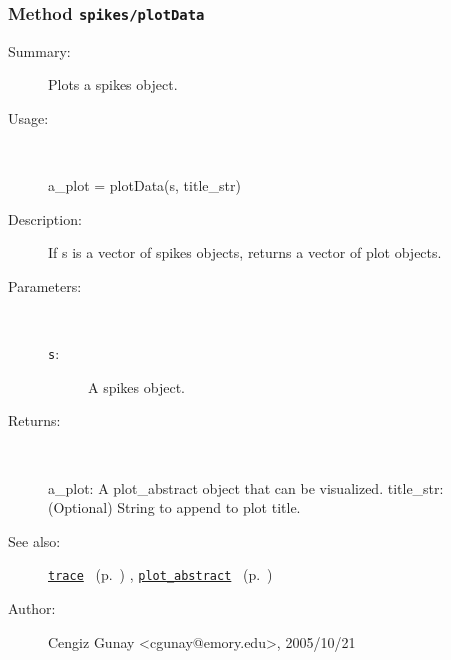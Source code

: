 \subsubsection[Method \texttt{plotData}]{Method \texttt{spikes/plotData}}%
%
\label{ref_spikes__plotData}%
\hypertarget{ref_spikes__plotData}{}%
\begin{description}
\item[Summary:]Plots a spikes object.
%
\item[Usage:]~%
\begin{lyxcode}%
a\_plot = plotData(s, title\_str)
%
\end{lyxcode}%
%
\item[Description:]%
If s is a vector of spikes objects, returns a vector of plot objects.
\item[Parameters:]~
\begin{description}%
\item[\texttt{s}:]
 A spikes object.
\end{description}%
%
\item[Returns:
]~

	a\_plot: A plot\_abstract object that can be visualized.
	title\_str: (Optional) String to append to plot title.
%
%
\item[See also:]%
\hyperlink{ref_trace}{\texttt{trace}}%
\ (p.~\pageref{ref_trace})%
%
, \hyperlink{ref_plot_abstract}{\texttt{plot\_abstract}}%
\ (p.~\pageref{ref_plot_abstract})%
%
%
\item[Author:]%
Cengiz Gunay <cgunay@emory.edu>, 2005/10/21
%
\end{description}
\methodline%
